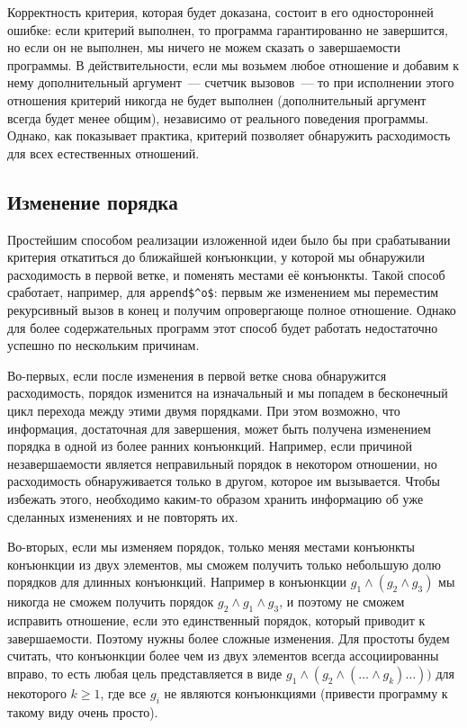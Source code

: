     Корректность критерия, которая будет доказана, состоит в его односторонней ошибке: если критерий выполнен, то программа гарантированно не завершится, но если он не выполнен, мы ничего не можем сказать о завершаемости программы. В действительности, если мы возьмем любое отношение и добавим к нему дополнительный аргумент~--- счетчик вызовов~--- то при исполнении этого отношения критерий никогда не будет выполнен (дополнительный аргумент всегда будет менее общим), независимо от реального поведения программы. Однако, как показывает практика, критерий позволяет обнаружить расходимость для всех естественных отношений.
    
  \subsection{Изменение порядка}  
  
    Простейшим способом реализации изложенной идеи было бы при срабатывании критерия откатиться до ближайшей конъюнкции, у которой мы обнаружили расходимость в первой ветке, и поменять местами её конъюнкты. Такой способ сработает, например, для \lstinline|append$^o$|: первым же изменением мы переместим рекурсивный вызов в конец и получим опровергающе полное отношение. Однако для более содержательных программ этот способ будет работать недостаточно успешно по нескольким причинам.
  
    Во-первых, если после изменения в первой ветке снова обнаружится расходимость, порядок изменится на изначальный и мы попадем в бесконечный цикл перехода между этими двумя порядками. При этом возможно, что информация, достаточная для завершения, может быть получена изменением порядка в одной из более ранних конъюнкций. Например, если причиной незавершаемости является неправильный порядок в некотором отношении, но расходимость обнаруживается только в другом, которое им вызывается. Чтобы избежать этого, необходимо каким-то образом хранить информацию об уже сделанных изменениях и не повторять их.
  
    Во-вторых, если мы изменяем порядок, только меняя местами конъюнкты конъюнкции из двух элементов, мы сможем получить только небольшую долю порядков для длинных конъюнкций. Например в конъюнкции $g_1 \wedge (g_2 \wedge g_3)$ мы никогда не сможем получить порядок $g_2 \wedge g_1 \wedge g_3$, и поэтому не сможем исправить отношение, если это единственный порядок, который приводит к завершаемости. Поэтому нужны более сложные изменения. Для простоты будем считать, что конъюнкции более чем из двух элементов всегда ассоциированны вправо, то есть любая цель представляется в виде $g_1 \wedge (g_2 \wedge ( \dots \wedge g_k) \dots ))$ для некоторого $k \ge 1$, где все $g_i$ не являются конъюнкциями (привести программу к такому виду очень просто).
  
